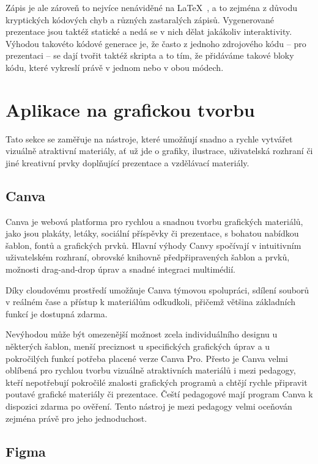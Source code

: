 Zápis je ale zároveň to nejvíce nenáviděné na \LaTeX~\cite{latex_reddit}, a to zejména z důvodu kryptických kódových chyb a různých zastaralých zápisů.
Vygenerované prezentace jsou taktéž statické a nedá se v nich dělat jakákoliv interaktivity. 
Výhodou takovéto kódové generace je, že často z jednoho zdrojového kódu -- pro prezentaci -- se dají tvořit taktéž skripta a to tím, že přidáváme takové bloky kódu, které vykreslí právě v jednom nebo v obou módech.

\section{Aplikace na grafickou tvorbu}

Tato sekce se zaměřuje na nástroje, které umožňují snadno a rychle vytvářet vizuálně atraktivní materiály, ať už jde o grafiky, ilustrace, uživatelská rozhraní či jiné kreativní prvky doplňující prezentace a vzdělávací materiály.

\subsection{Canva}\label{text:canva}

Canva je webová platforma pro rychlou a snadnou tvorbu grafických materiálů, jako jsou plakáty, letáky, sociální příspěvky či prezentace, s bohatou nabídkou šablon, fontů a grafických prvků. 
Hlavní výhody Canvy spočívají v intuitivním uživatelském rozhraní, obrovské knihovně předpřipravených šablon a prvků, možnosti drag-and-drop úprav a snadné integraci multimédií.

Díky cloudovému prostředí umožňuje Canva týmovou spolupráci, sdílení souborů v reálném čase a přístup k materiálům odkudkoli, přičemž většina základních funkcí je dostupná zdarma. 

Nevýhodou může být omezenější možnost zcela individuálního designu u některých šablon, menší preciznost u specifických grafických úprav a u pokročilých funkcí potřeba placené verze Canva Pro. 
Přesto je Canva velmi oblíbená pro rychlou tvorbu vizuálně atraktivních materiálů i mezi pedagogy, kteří nepotřebují pokročilé znalosti grafických programů a chtějí rychle připravit poutavé grafické materiály či prezentace.
Čeští pedagogové mají program Canva k dispozici zdarma po ověření. Tento nástroj je mezi pedagogy velmi oceňován zejména právě pro jeho jednoduchost.

\subsection{Figma}\label{text:figma_popis}


